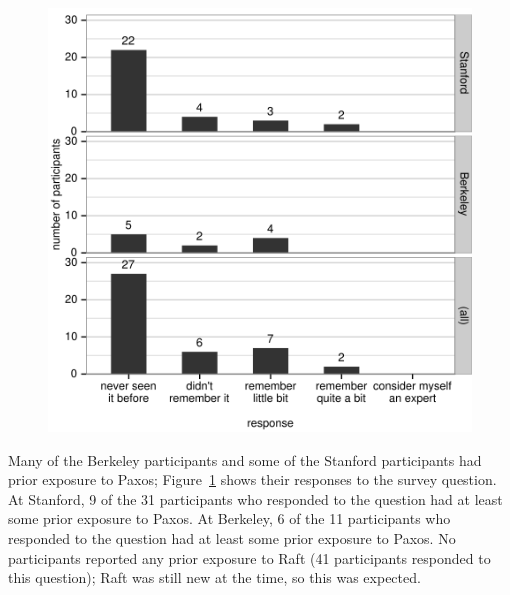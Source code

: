 \begin{figure}
\centering
{
\includegraphics{userstudy/surveypaxos}
}
\label{fig:userstudy:surveypaxos}
\end{figure}

Many of the Berkeley participants and some of the Stanford participants
had prior exposure to Paxos; Figure~\ref{fig:userstudy:surveypaxos} shows
their responses to the survey question. At Stanford, 9 of the 31
participants who responded to the question had at least some prior
exposure to Paxos. At Berkeley, 6 of the 11 participants who
responded to the question had at least some prior exposure to Paxos.
No participants reported any prior exposure to Raft (41 participants
responded to this question); Raft was still new at the time, so this was
expected.

